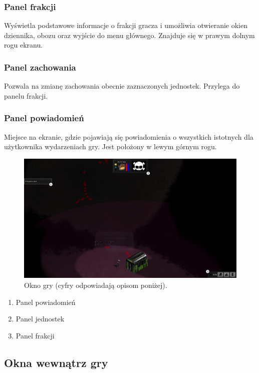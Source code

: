 \documentclass[licencjacka]{pracamgr}
\begin{document}
      \subsubsection{Panel frakcji}
	Wyświetla podstawowe informacje o frakcji gracza i umożliwia otwieranie okien dziennika, obozu oraz wyjście do menu głównego.
	Znajduje się w prawym dolnym rogu ekranu.
      \subsubsection{Panel zachowania}
	Pozwala na zmianę zachowania obecnie zaznaczonych jednostek. Przylega do panelu frakcji.
      \subsubsection{Panel powiadomień}
	Miejsce na ekranie, gdzie pojawiają się powiadomienia o wszystkich istotnych dla użytkownika wydarzeniach gry. Jest położony w lewym górnym rogu.

      \begin{figure}[htbp]
	\centering
	\includegraphics[scale=0.22]{Game.png}
	\caption{Okno gry (cyfry odpowiadają opisom poniżej).}
      \end{figure}

      \begin{enumerate}
       \item Panel powiadomień
       \item Panel jednostek
       \item Panel frakcji
      \end{enumerate}


    \subsection{Okna wewnątrz gry}
\end{document}
